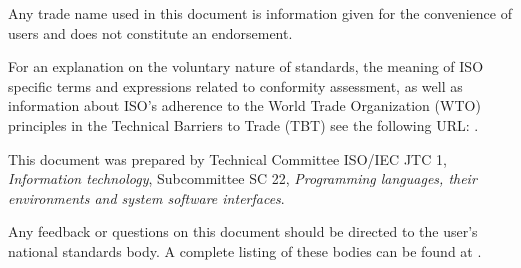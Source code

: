 Any trade name used in this document is information given for the convenience
of users and does not constitute an endorsement.

For an explanation on
the voluntary nature of standards,
the meaning of ISO specific terms and expressions related
to conformity assessment, as well as information about ISO's adherence
to the World Trade Organization (WTO) principles
in the Technical Barriers to Trade (TBT) see the following URL:
\href{http://www.iso.org/iso/foreword.html}{}.

This document was prepared by
Technical Committee ISO/IEC JTC 1, \textit{Information technology},
Subcommittee SC 22, \textit{Programming languages, their environments and system software interfaces}.

Any feedback or questions on this document
should be directed to the user's national standards body.
A complete listing of these bodies can be found at
\href{http://www.iso.org/members.html}{}.
